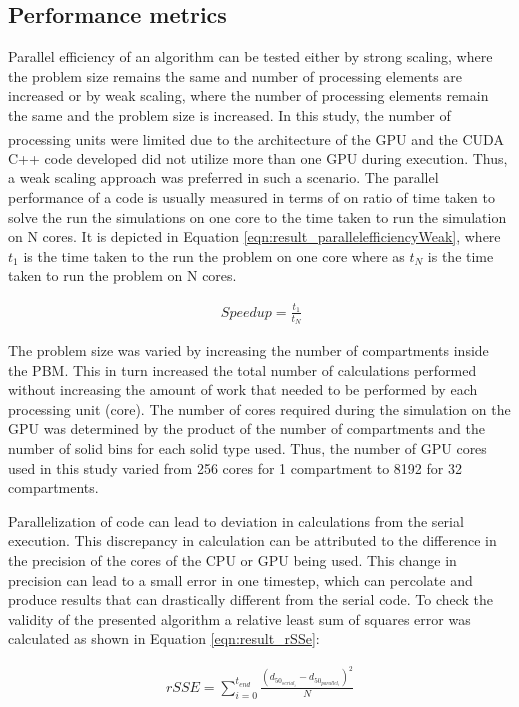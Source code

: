 \documentclass[review]{elsarticle}
\begin{document}
\begin{linenumbers}
 \subsection{Performance metrics}
Parallel efficiency of an algorithm can be tested either by strong scaling, 
where the problem size remains the same and number of processing elements 
are increased or by weak scaling, where the number of processing elements 
remain the same and the problem size is increased. In this study, the 
number of processing units were limited due to the architecture of the 
GPU and the CUDA\textsuperscript{\tiny\textregistered} C++ code developed did not utilize more than one GPU 
during execution. Thus, a weak scaling approach was preferred in such a 
scenario. The parallel performance of a code is usually measured in 
terms of on ratio of time taken to solve the run the simulations on one 
core to the time taken to run the simulation on N cores. It is depicted in
Equation \ref{eqn:result_parallelefficiencyWeak}, where $t_1$ is the time taken 
to the run the problem on one core where as $t_N$ is the time taken to 
run the problem on N cores.

\begin{align}
\ Speedup = \frac{t_1}{t_N}
\label{eqn:result_parallelefficiencyWeak}
\end{align}

The problem size was varied by increasing the number of compartments inside 
the PBM. This in turn increased the total number of calculations performed 
without increasing the amount of work that needed to be performed by each 
processing unit (core). The number of cores required during the simulation 
on the GPU was determined by the product of the number of compartments and 
the number of solid bins for each solid type used. Thus, the number of GPU 
cores used in this study varied from 256 cores for 1 compartment to 8192 
for 32 compartments.

Parallelization of code can lead to deviation in calculations from 
the serial execution. This discrepancy in calculation can be attributed to 
the difference in the precision of the cores of the CPU or GPU being used. 
This change in precision can lead to a small error in one timestep, which can 
percolate and produce results that can drastically different from the serial 
code. To check the validity of the presented algorithm a relative least sum 
of squares error was calculated as shown in Equation \ref{eqn:result_rSSe}:

\begin{align}
rSSE =  \sum_{i=0}^{t_{end}} \frac{(d_{50_{serial_i}}-d_{50_{parallel_i}})^2}{N}
\label{eqn:result_rSSe}
\end{align}


\end{linenumbers}
\end{document}
